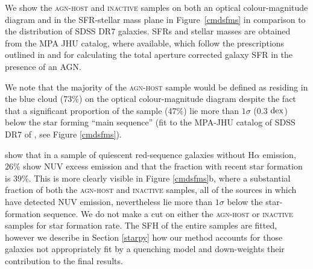 We show the \textsc{agn-host} and \textsc{inactive}  samples on both an optical colour-magnitude diagram and in the SFR-stellar mass plane in Figure~\ref{cmdsfms} in comparison to the distribution of SDSS DR7 galaxies. SFRs and stellar masses are obtained from the MPA JHU catalog, where available, which follow the prescriptions outlined in \cite{brinchmann04} and \cite{Salim07} for calculating the total aperture corrected galaxy SFR in the presence of an AGN. 

We note that the majority of the \textsc{agn-host} sample would be defined as residing in the blue cloud ($73\%$) on the optical colour-magnitude diagram despite the fact that a significant proportion of the sample ($47\%$) lie more than $1\sigma$ ($0.3$ $\rm{dex}$) below the star forming ``main sequence'' (fit to the MPA-JHU catalog of SDSS DR7 of \citealt{kauffmann03, brinchmann04}, see Figure \ref{cmdsfms}). 

\cite{Ko13} show that in a sample of quiescent red-sequence galaxies without $\mathrm{H}\alpha$ emission, $26\%$ show NUV excess emission and that the fraction with recent star formation is $39\%$. This is more clearly visible in Figure \ref{cmdsfms}b, where a substantial fraction of both the \textsc{agn-host} and \textsc{inactive} samples, all of the sources in which have detected NUV emission, nevertheless lie more than $1\sigma$ below the star-formation sequence. We do not make a cut on either the \textsc{agn-host} or \textsc{inactive} samples for star formation rate. The SFH of the entire samples are fitted, however we describe in Section \ref{starpy} how our method accounts for those galaxies not appropriately fit by a quenching model and down-weights their contribution to the final results.

